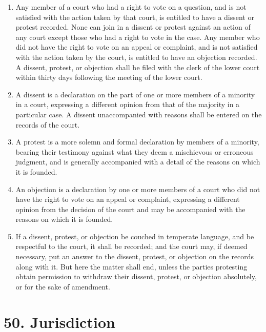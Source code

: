 \documentclass[
]{book}
\providecommand{\tightlist}{%
  \setlength{\itemsep}{0pt}\setlength{\parskip}{0pt}}
\begin{document}
\protect\hypertarget{chapter-slug-49-dissents-protests-and-objections}{\href{}{}}

\begin{enumerate}
\def\labelenumi{\arabic{enumi}.}
\tightlist
\item
  \protect\hypertarget{49}{\href{}{}}Any member of a court who had a right to vote on a question, and is not satisfied with the action taken by that court, is entitled to have a dissent or protest recorded. None can join in a dissent or protest against an action of any court except those who had a right to vote in the case. Any member who did not have the right to vote on an appeal or complaint, and is not satisfied with the action taken by the court, is entitled to have an objection recorded. A dissent, protest, or objection shall be filed with the clerk of the lower court within thirty days following the meeting of the lower court.
\item
  A dissent is a declaration on the part of one or more members of a minority in a court, expressing a different opinion from that of the majority in a particular case. A dissent unaccompanied with reasons shall be entered on the records of the court.
\item
  A protest is a more solemn and formal declaration by members of a minority, bearing their testimony against what they deem a mischievous or erroneous judgment, and is generally accompanied with a detail of the reasons on which it is founded.
\item
  An objection is a declaration by one or more members of a court who did not have the right to vote on an appeal or complaint, expressing a different opinion from the decision of the court and may be accompanied with the reasons on which it is founded.
\item
  If a dissent, protest, or objection be couched in temperate language, and be respectful to the court, it shall be recorded; and the court may, if deemed necessary, put an answer to the dissent, protest, or objection on the records along with it. But here the matter shall end, unless the parties protesting obtain permission to withdraw their dissent, protest, or objection absolutely, or for the sake of amendment.
\end{enumerate}

\hypertarget{jurisdiction}{%
\section*{50. Jurisdiction}\label{jurisdiction}}
\end{document}
